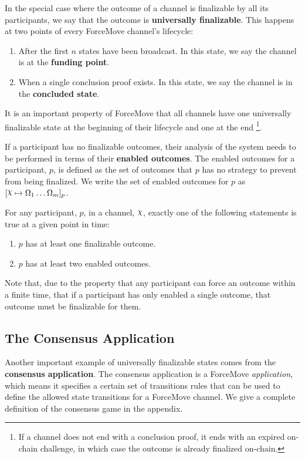 \documentclass{article}
\begin{document}
In the special case where the outcome of a channel is finalizable by all its participants, we say that the outcome is \textbf{universally finalizable}.
This happens at two points of every ForceMove channel's lifecycle:
\begin{enumerate}
  \item After the first $n$ states have been broadcast. In this state, we say the channel is at the \textbf{funding point}.
  \item When a single conclusion proof exists. In this state, we say the channel is in the \textbf{concluded state}.
\end{enumerate}
It is an important property of ForceMove that all channels have one universally finalizable
state at the beginning of their lifecycle and one at the end
\footnote{If a channel does not end with a conclusion proof, it ends with an expired on-chain challenge,
in which case the outcome is already finalized on-chain.}.

If a participant has no finalizable outcomes, their analysis of the system needs to be performed
in terms of their \textbf{enabled outcomes}.
The enabled outcomes for a participant, $p$, is defined as the set of outcomes that $p$ has
no strategy to prevent from being finalized.
We write the set of enabled outcomes for $p$ as $\finalizable{\rchi}{\Omega_1 \dots \Omega_m}{p}$.

For any participant, $p$, in a channel, $\rchi$, exactly one of the following statements is
true at a given point in time:
\begin{enumerate}
  \item $p$ has at least one finalizable outcome.
  \item $p$ has at least two enabled outcomes.
\end{enumerate}
Note that, due to the property that any participant can force an outcome within a finite time,
that if a participant has only enabled a single outcome, that outcome must be finalizable for them.

\subsection{The Consensus Application}

Another important example of universally finalizable states comes from the \textbf{consensus application}.
The consensus application is a ForceMove \textit{application}, which means it specifies a certain
set of transitions rules that can be used to define the allowed state transitions for a ForceMove
channel.
We give a complete definition of the consensus game in the appendix.
\end{document}

